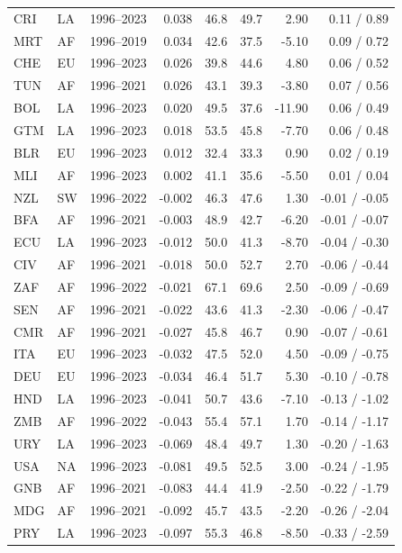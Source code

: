 \begin{tabular}{llrrrrrr}
CRI & LA & 1996--2023 & 0.038 & 46.8 & 49.7 & 2.90 & 0.11 / 0.89 \\
MRT & AF & 1996--2019 & 0.034 & 42.6 & 37.5 & -5.10 & 0.09 / 0.72 \\
CHE & EU & 1996--2023 & 0.026 & 39.8 & 44.6 & 4.80 & 0.06 / 0.52 \\
TUN & AF & 1996--2021 & 0.026 & 43.1 & 39.3 & -3.80 & 0.07 / 0.56 \\
BOL & LA & 1996--2023 & 0.020 & 49.5 & 37.6 & -11.90 & 0.06 / 0.49 \\
GTM & LA & 1996--2023 & 0.018 & 53.5 & 45.8 & -7.70 & 0.06 / 0.48 \\
BLR & EU & 1996--2023 & 0.012 & 32.4 & 33.3 & 0.90 & 0.02 / 0.19 \\
MLI & AF & 1996--2023 & 0.002 & 41.1 & 35.6 & -5.50 & 0.01 / 0.04 \\
NZL & SW & 1996--2022 & -0.002 & 46.3 & 47.6 & 1.30 & -0.01 / -0.05 \\
BFA & AF & 1996--2021 & -0.003 & 48.9 & 42.7 & -6.20 & -0.01 / -0.07 \\
ECU & LA & 1996--2023 & -0.012 & 50.0 & 41.3 & -8.70 & -0.04 / -0.30 \\
CIV & AF & 1996--2021 & -0.018 & 50.0 & 52.7 & 2.70 & -0.06 / -0.44 \\
ZAF & AF & 1996--2022 & -0.021 & 67.1 & 69.6 & 2.50 & -0.09 / -0.69 \\
SEN & AF & 1996--2021 & -0.022 & 43.6 & 41.3 & -2.30 & -0.06 / -0.47 \\
CMR & AF & 1996--2021 & -0.027 & 45.8 & 46.7 & 0.90 & -0.07 / -0.61 \\
ITA & EU & 1996--2023 & -0.032 & 47.5 & 52.0 & 4.50 & -0.09 / -0.75 \\
DEU & EU & 1996--2023 & -0.034 & 46.4 & 51.7 & 5.30 & -0.10 / -0.78 \\
HND & LA & 1996--2023 & -0.041 & 50.7 & 43.6 & -7.10 & -0.13 / -1.02 \\
ZMB & AF & 1996--2022 & -0.043 & 55.4 & 57.1 & 1.70 & -0.14 / -1.17 \\
URY & LA & 1996--2023 & -0.069 & 48.4 & 49.7 & 1.30 & -0.20 / -1.63 \\
USA & NA & 1996--2023 & -0.081 & 49.5 & 52.5 & 3.00 & -0.24 / -1.95 \\
GNB & AF & 1996--2021 & -0.083 & 44.4 & 41.9 & -2.50 & -0.22 / -1.79 \\
MDG & AF & 1996--2021 & -0.092 & 45.7 & 43.5 & -2.20 & -0.26 / -2.04 \\
PRY & LA & 1996--2023 & -0.097 & 55.3 & 46.8 & -8.50 & -0.33 / -2.59 \\

\end{tabular}
